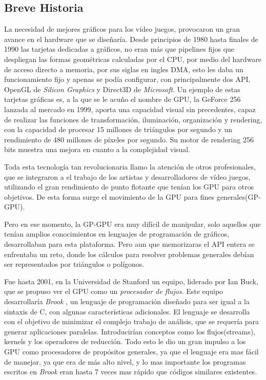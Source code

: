 \subsection{Breve Historia}
La necesidad de mejores gráficos para los vídeo juegos, provocaron un gran avance en el hardware que se diseñaría. Desde principios de 1980 hasta finales de 1990 las tarjetas dedicadas a gráficos, no eran más que pipelines fijos que despliegan las formas geométricas calculadas por el CPU, por medio del hardware de acceso directo a memoria, por sus siglas en ingles DMA, esto les daba un funcionamiento fijo y apenas se podía configurar, con principalmente dos API, OpenGL de \textit{Silicon Graphics} y Direct3D de \textit{Microsoft}. Un ejemplo de estas tarjetas gráficas es, a la que se le acuño el nombre de GPU, la GeForce 256\cite{GeForce256} lanzada al mercado en 1999, aporta una capacidad visual sin precedentes, capaz de realizar las funciones de  transformación, iluminación, organización y rendering, con la capacidad de procesar 15 millones de triángulos por segundo y un rendimiento de 480 millones de píxeles por segundo. Su motor de rendering  256 bits muestra una mejora en cuanto a la complejidad visual.

Toda esta tecnología tan revolucionaria llamo la atención de otros profesionales, que se integraron a el trabajo de los artistas y desarrolladores de vídeo juegos, utilizando el gran rendimiento de punto flotante que tenían los GPU para otros objetivos. De esta forma surge el movimiento de la GPU para fines generales(GP-GPU).

Pero en ese momento, la GP-GPU era muy difícil de manipular, solo aquellos que tenían amplios conocimientos en lenguajes de programación de gráficos, desarrollaban para esta plataforma. Pero aun que memorizaras el API entera se enfrentaba un reto, donde los cálculos para resolver problemas generales debían ser representados por triángulos o polígonos.

Fue hasta 2001, en la Universidad de Stanford un equipo, liderado por Ian Buck, que se propuso ver el GPU como un  \textit{procesador de flujos}. Este equipo desarrollaría \textit{Brook} \cite{Buck2001}, un lenguaje de programación diseñado para ser igual a la sintaxis de C, con algunas características adicionales. El lenguaje se desarrolla con el objetivo de minimizar el complejo trabajo de análisis, que se requería para generar aplicaciones paralelas. Introducirían conceptos como los flujos(streams), kernels y los operadores de reducción. Todo esto le dio un gran impulso a los GPU como procesadores de propósitos generales, ya que el lenguaje era mas fácil de manejar, ya que era de más alto nivel, y lo mas importante los programas escritos en \textit{Brook} eran hasta 7 veces mas rápido que códigos similares existentes.

